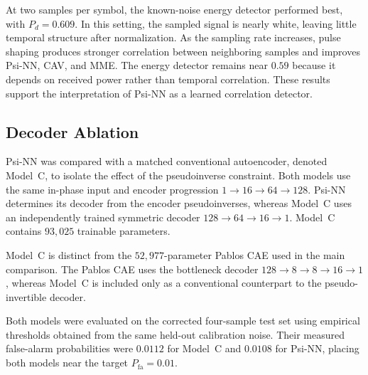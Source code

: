 \documentclass[conference]{IEEEtran}
\begin{document}
At two samples per symbol, the known-noise energy detector performed
best, with $P_d=0.609$. In this setting, the sampled signal is nearly
white, leaving little temporal structure after normalization. As the
sampling rate increases, pulse shaping produces stronger correlation
between neighboring samples and improves Psi-NN, CAV, and MME. The
energy detector remains near $0.59$ because it depends on received
power rather than temporal correlation. These results support the
interpretation of Psi-NN as a learned correlation detector.

\subsection{Decoder Ablation}
\label{subsec:decoder_ablation_results}

Psi-NN was compared with a matched conventional autoencoder, denoted
Model~C, to isolate the effect of the pseudoinverse constraint. Both
models use the same in-phase input and encoder progression
$1\rightarrow16\rightarrow64\rightarrow128$. Psi-NN determines its
decoder from the encoder pseudoinverses, whereas Model~C uses an
independently trained symmetric decoder
$128\rightarrow64\rightarrow16\rightarrow1$. Model~C contains
$93{,}025$ trainable parameters.

Model~C is distinct from the $52{,}977$-parameter Pablos CAE used in
the main comparison. The Pablos CAE uses the bottleneck decoder
$128\rightarrow8\rightarrow8\rightarrow16\rightarrow1$, whereas
Model~C is included only as a conventional counterpart to the
pseudo-invertible decoder.

Both models were evaluated on the corrected four-sample test set using
empirical thresholds obtained from the same held-out calibration noise.
Their measured false-alarm probabilities were $0.0112$ for Model~C and
$0.0108$ for Psi-NN, placing both models near the target
$P_{\mathrm{fa}}=0.01$.

\begin{table}[!t]
\centering
\caption{Decoder ablation on the corrected four-sample test set.}
\label{tab:decoder_ablation}
\end{table}
\end{document}
